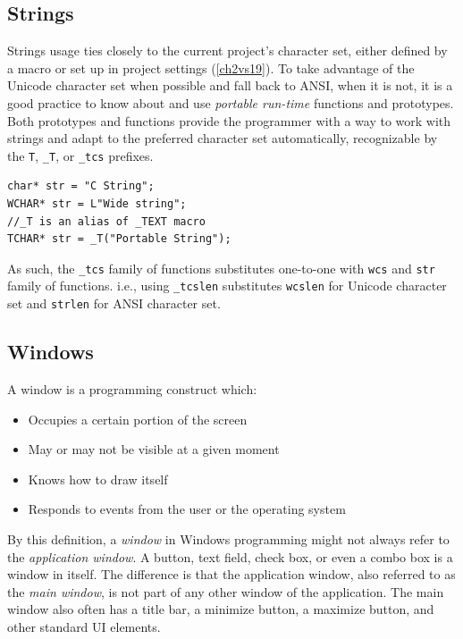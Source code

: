 \subsection*{Strings}
Strings usage ties closely to the current project's character set, either defined by a macro or set up in project settings (\ref{ch2vs19}). To take advantage of the Unicode character set when possible and fall back to ANSI, when it is not, it is a good practice to know about and use \textit{portable run-time} functions and prototypes. Both prototypes and functions provide the programmer with a way to work with strings and adapt to the preferred character set automatically, recognizable by the \lstinline{T}, \lstinline{_T}, or \lstinline{_tcs} prefixes.

\begin{lstlisting}[caption={An example of defining static strings}]
char* str = "C String";
WCHAR* str = L"Wide string";
//_T is an alias of _TEXT macro
TCHAR* str = _T("Portable String");
\end{lstlisting}
As such, the \lstinline{_tcs} family of functions substitutes one-to-one with \lstinline{wcs} and \lstinline{str} family of functions. i.e., using \lstinline{_tcslen} substitutes \lstinline{wcslen} for Unicode character set and \lstinline{strlen} for ANSI character set.\cite{WinUnicodeSummary}

\subsection*{Windows}
\label{ch2Windows}
A window is a programming construct which:
\begin{itemize}
    \item Occupies a certain portion of the screen
    \item May or may not be visible at a given moment
    \item Knows how to draw itself
    \item Responds to events from the user or the operating system
\end{itemize}

By this definition, a \textit{window} in Windows programming might not always refer to the \textit{application window}. A button, text field, check box, or even a combo box is a window in itself. The difference is that the application window, also referred to as the \textit{main window}, is not part of any other window of the application. The main window also often has a title bar, a minimize button, a maximize button, and other standard UI elements.

